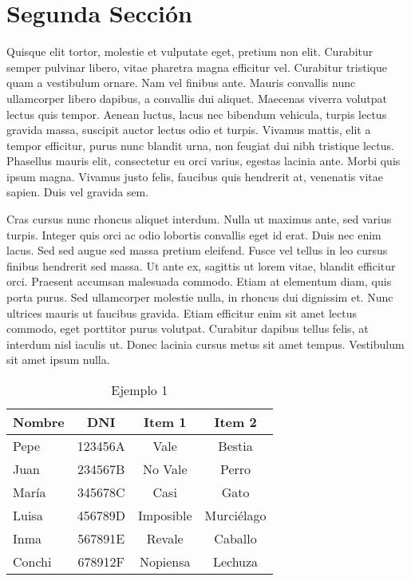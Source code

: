 \documentclass[a4paper,twoside=false,12pt,spanish,DIV=7]{scrbook}
\begin{document}
\section{Segunda Sección}
Quisque elit tortor, molestie et vulputate eget, pretium non elit. Curabitur semper pulvinar libero, vitae pharetra magna efficitur vel. Curabitur tristique quam a vestibulum ornare. Nam vel finibus ante. Mauris convallis nunc ullamcorper libero dapibus, a convallis dui aliquet. Maecenas viverra volutpat lectus quis tempor. Aenean luctus, lacus nec bibendum vehicula, turpis lectus gravida massa, suscipit auctor lectus odio et turpis. Vivamus mattis, elit a tempor efficitur, purus nunc blandit urna, non feugiat dui nibh tristique lectus. Phasellus mauris elit, consectetur eu orci varius, egestas lacinia ante. Morbi quis ipsum magna. Vivamus justo felis, faucibus quis hendrerit at, venenatis vitae sapien. Duis vel gravida sem.

Cras cursus nunc rhoncus aliquet interdum. Nulla ut maximus ante, sed varius turpis. Integer quis orci ac odio lobortis convallis eget id erat. Duis nec enim lacus. Sed sed augue sed massa pretium eleifend. Fusce vel tellus in leo cursus finibus hendrerit sed massa. Ut ante ex, sagittis ut lorem vitae, blandit efficitur orci. Praesent accumsan malesuada commodo. Etiam at elementum diam, quis porta purus. Sed ullamcorper molestie nulla, in rhoncus dui dignissim et. Nunc ultrices mauris ut faucibus gravida. Etiam efficitur enim sit amet lectus commodo, eget porttitor purus volutpat. Curabitur dapibus tellus felis, at interdum nisl iaculis ut. Donec lacinia cursus metus sit amet tempus. Vestibulum sit amet ipsum nulla.

\begin{table}
\centering
\begin{tabular}{l c c c}
\toprule
Nombre&DNI&Item 1&Item 2\\
\midrule
\midrule
Pepe&123456A&Vale&Bestia\\\midrule
Juan&234567B&No Vale&Perro\\\midrule
María&345678C&Casi&Gato\\\midrule
Luisa&456789D&Imposible&Murciélago\\\midrule
Inma&567891E&Revale&Caballo\\\midrule
Conchi&678912F&Nopiensa&Lechuza\\\midrule
\bottomrule
\end{tabular}
\caption{Ejemplo 1}
\end{table}
\end{document}
